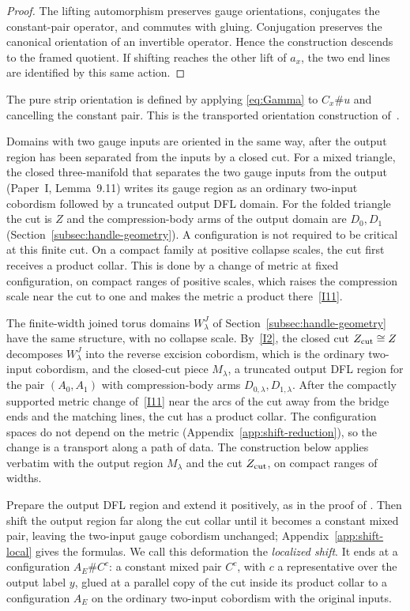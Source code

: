 \documentclass[11pt]{amsart}
\theoremstyle{definition}
\theoremstyle{remark}
\theoremstyle{plain}
\numberwithin{equation}{section}
\begin{document}
\begin{proof}
The lifting automorphism preserves gauge orientations,
conjugates the constant-pair operator, and commutes with
gluing. Conjugation preserves the canonical orientation of
an invertible operator. Hence the construction descends to
the framed quotient. If shifting reaches the other lift of
$a_x$, the two end lines are identified by this same action.
\end{proof}

The pure strip orientation is defined by applying
\eqref{eq:Gamma} to $C_x\#u$ and cancelling the constant
pair. This is the transported orientation construction
of~\cite[Section~4.7]{DFL}.

Domains with two gauge inputs are oriented in the same way, after the
output region has been separated from the inputs by a closed cut. For
a mixed triangle, the closed three-manifold that separates the two
gauge inputs from the output (Paper~I, Lemma~9.11) writes its gauge
region as an ordinary two-input cobordism followed by a truncated
output DFL domain. For the folded triangle the cut is $Z$ and the
compression-body arms of the output domain are $D_0,D_1$
(Section~\ref{subsec:handle-geometry}). A configuration is not required
to be critical at this finite cut. On a compact family at positive
collapse scales, the cut first receives a product collar. This is done
by a change of metric at fixed configuration, on compact ranges of
positive scales, which raises the compression scale near the cut to one
and makes the metric a product there~\ref{I11}.

The finite-width joined torus domains $W^J_\lambda$ of
Section~\ref{subsec:handle-geometry} have the same structure, with no
collapse scale. By~\ref{I2}, the closed cut $Z_{\rm cut}\cong Z$
decomposes $W^J_\lambda$ into the reverse excision cobordism, which is
the ordinary two-input cobordism, and the closed-cut piece $M_\lambda$,
a truncated output DFL region for the pair $(A_0,A_1)$ with
compression-body arms $D_{0,\lambda},D_{1,\lambda}$. After the
compactly supported metric change of~\ref{I11} near the
arcs of the cut away from the bridge ends and the matching lines, the
cut has a product collar. The configuration spaces do not depend on
the metric (Appendix~\ref{app:shift-reduction}), so the change is a
transport along a path of data. The construction below applies
verbatim with the output region $M_\lambda$ and the cut $Z_{\rm cut}$,
on compact ranges of widths.

Prepare the output DFL region and extend it positively, as in the
proof of \cite[Lemma~4.62]{DFL}. Then shift the output region far along
the cut collar until it becomes a constant mixed pair, leaving the
two-input gauge cobordism unchanged; Appendix~\ref{app:shift-local}
gives the formulas. We call this deformation the \emph{localized
shift}. It ends at a configuration $A_E\#C^{c}$: a constant mixed pair
$C^c$, with $c$ a representative over the output label $y$, glued at a
parallel copy of the cut inside its product collar to a configuration
$A_E$ on the ordinary two-input cobordism with the original inputs.
\end{document}
